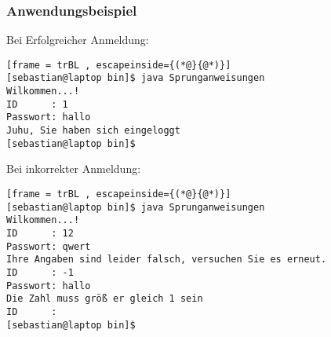 \subsubsection{Anwendungsbeispiel}
Bei Erfolgreicher Anmeldung:
\begin{lstlisting}[frame = trBL , escapeinside={(*@}{@*)}]
[sebastian@laptop bin]$ java Sprunganweisungen 	
Wilkommen...!
ID      : 1
Passwort: hallo
Juhu, Sie haben sich eingeloggt
[sebastian@laptop bin]$ 
\end{lstlisting}
Bei inkorrekter Anmeldung:
\begin{lstlisting}[frame = trBL , escapeinside={(*@}{@*)}]
[sebastian@laptop bin]$ java Sprunganweisungen 	
Wilkommen...!
ID      : 12
Passwort: qwert
Ihre Angaben sind leider falsch, versuchen Sie es erneut.
ID      : -1
Passwort: hallo
Die Zahl muss größ er gleich 1 sein
ID      : 
[sebastian@laptop bin]$ 
\end{lstlisting}